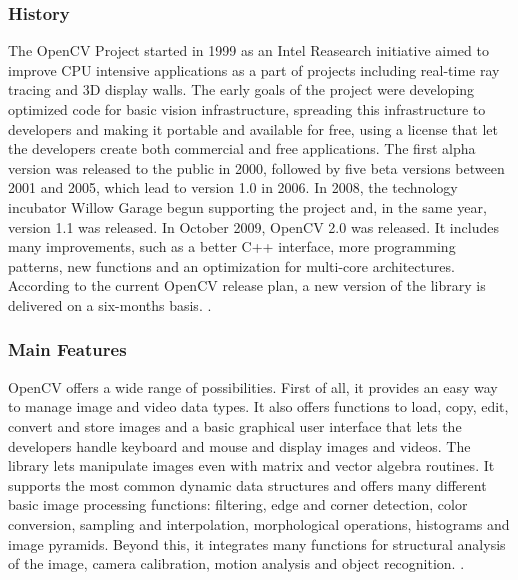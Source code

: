 	\subsubsection*{History}
	The \mbox{OpenCV} Project started in 1999 as an Intel Reasearch initiative aimed to improve CPU intensive applications as a part of projects including real-time ray tracing and 3D display walls. The early goals of the project were developing optimized code for basic vision infrastructure, spreading this infrastructure to developers and making it portable and available for free, using a license that let the developers create both commercial and free applications.\newline
	The first alpha version was released to the public in 2000, followed by five beta versions between 2001 and 2005, which lead to version 1.0 in 2006. In 2008, the technology incubator Willow Garage begun supporting the project and, in the same year, version 1.1  was released.
	In October 2009, \mbox{OpenCV} 2.0 was released. It includes many improvements, such as a better C++ interface, more programming patterns, new functions and an optimization for multi-core architectures. According to the current \mbox{OpenCV} release plan, a new version of the library is delivered on a six-months basis. \cite{OpenCV:ChangeLogs}.
	
	\subsubsection*{Main Features}
	\mbox{OpenCV} offers a wide range of possibilities. First of all, it provides an easy way to manage image and video data types. It also offers functions to load, copy, edit, convert and store images and a basic graphical user interface that lets the developers handle keyboard and mouse and display images and videos. The library lets manipulate images even with matrix and vector algebra routines. It supports the most common dynamic data structures and offers many different basic image processing functions: filtering, edge and corner detection, color conversion, sampling and interpolation, morphological operations, histograms and image pyramids. Beyond this, it integrates many functions for structural analysis of the image, camera calibration, motion analysis and object recognition. \cite{Agam2006}.
